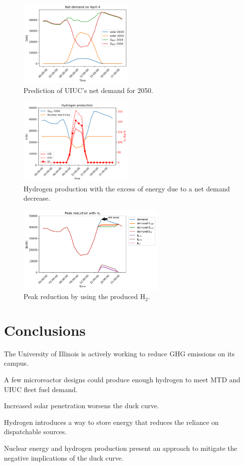 \documentclass[11pt,letterpaper]{article}
\begin{document}
	\begin{figure}[htbp!]
	    \centering
		\includegraphics[height=4.3cm]{figures/uiuc-duck}
		\hfill
		\caption{Prediction of \gls{UIUC}'s net demand for 2050.}
		\label{fig:uiuc-duck1}
	\end{figure}

	\begin{figure}[htbp!]
	    \centering
		\includegraphics[height=4.3cm]{figures/uiuc-hydro2B}
		\hfill
		\caption{Hydrogen production with the excess of energy due to a net demand decrease.}
		\label{fig:uiuc-duck2}
	\end{figure}

	\begin{figure}[htbp!]
	    \centering
		\includegraphics[height=4.3cm]{figures/uiuc-hydro3B}
		\hfill
		\caption{Peak reduction by using the produced H$_2$.}
		\label{fig:uiuc-duck3}
	\end{figure}




\section{Conclusions}

The University of Illinois is actively working to reduce GHG emissions on its campus. 

A few microreactor designs could produce enough hydrogen to meet MTD and UIUC fleet fuel demand.

Increased solar penetration worsens the duck curve.

Hydrogen introduces a way to store energy that reduces the reliance on dispatchable sources.

Nuclear energy and hydrogen production present an approach to mitigate the negative implications of the duck curve.


\pagebreak


\end{document}
